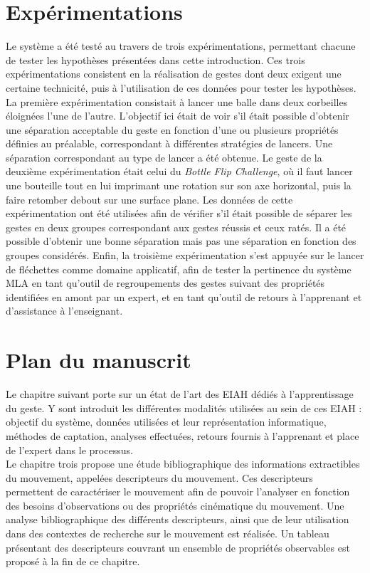 \section{Expérimentations}
Le système a été testé au travers de trois expérimentations, permettant chacune de tester les hypothèses présentées dans cette introduction. Ces trois expérimentations consistent en la réalisation de gestes dont deux exigent une certaine technicité, puis à l'utilisation de ces données pour tester les hypothèses. La première expérimentation consistait à lancer une balle dans deux corbeilles éloignées l'une de l'autre. L'objectif ici était de voir s'il était possible d'obtenir une séparation acceptable du geste en fonction d'une ou plusieurs propriétés définies au préalable, correspondant à différentes stratégies de lancers. Une séparation correspondant au type de lancer a été obtenue. Le geste de la deuxième expérimentation était celui du \textit{Bottle Flip Challenge}, où il faut lancer une bouteille tout en lui imprimant une rotation sur son axe horizontal, puis la faire retomber debout sur une surface plane. Les données de cette expérimentation ont été utilisées afin de vérifier s'il était possible de séparer les gestes en deux groupes correspondant aux gestes réussis et ceux ratés. Il a été possible d'obtenir une bonne séparation mais pas une séparation en fonction des groupes considérés. Enfin, la troisième expérimentation s'est appuyée sur le lancer de fléchettes comme domaine applicatif, afin de tester la pertinence du système MLA en tant qu'outil de regroupements des gestes suivant des propriétés identifiées en amont par un expert, et en tant qu'outil de retours à l'apprenant et d'assistance à l'enseignant.

\section{Plan du manuscrit}
Le chapitre suivant porte sur un état de l'art des EIAH dédiés à l'apprentissage du geste. Y sont introduit les différentes modalités utilisées au sein de ces EIAH : objectif du système, données utilisées et leur représentation informatique, méthodes de captation, analyses effectuées, retours fournis à l'apprenant et place de l'expert dans le processus.\\

Le chapitre trois propose une étude bibliographique des informations extractibles du mouvement, appelées descripteurs du mouvement. Ces descripteurs permettent de caractériser le mouvement afin de pouvoir l'analyser en fonction des besoins d'observations ou des propriétés cinématique du mouvement. Une analyse bibliographique des différents descripteurs, ainsi que de leur utilisation dans des contextes de recherche sur le mouvement est réalisée. Un tableau présentant des descripteurs couvrant un ensemble de propriétés observables est proposé à la fin de ce chapitre.\\


